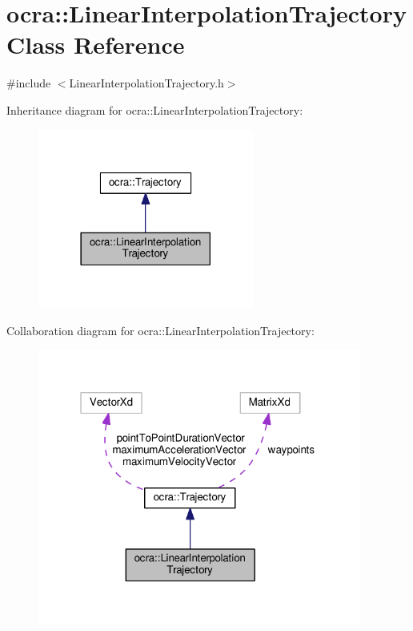 \hypertarget{classocra_1_1LinearInterpolationTrajectory}{}\section{ocra\+:\+:Linear\+Interpolation\+Trajectory Class Reference}
\label{classocra_1_1LinearInterpolationTrajectory}


{\ttfamily \#include $<$Linear\+Interpolation\+Trajectory.\+h$>$}



Inheritance diagram for ocra\+:\+:Linear\+Interpolation\+Trajectory\+:
\nopagebreak
\begin{figure}[H]
\begin{center}
\leavevmode
\includegraphics[width=201pt]{d2/d7a/classocra_1_1LinearInterpolationTrajectory__inherit__graph}
\end{center}
\end{figure}


Collaboration diagram for ocra\+:\+:Linear\+Interpolation\+Trajectory\+:
\nopagebreak
\begin{figure}[H]
\begin{center}
\leavevmode
\includegraphics[width=301pt]{df/d3f/classocra_1_1LinearInterpolationTrajectory__coll__graph}
\end{center}
\end{figure}
